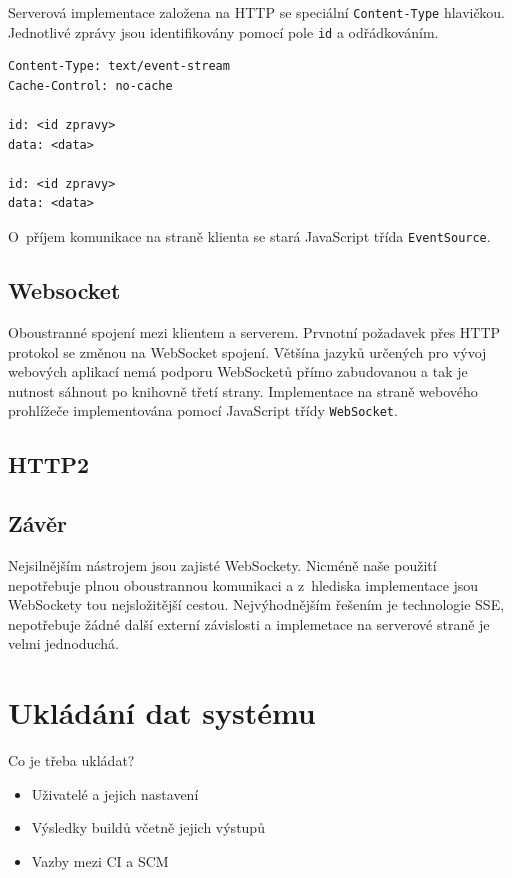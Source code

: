 \noindent
Serverová implementace založena na HTTP se speciální \verb|Content-Type| hlavičkou.
Jednotlivé zprávy jsou identifikovány pomocí pole \verb|id| a odřádkováním.

\begin{verbatim}
Content-Type: text/event-stream
Cache-Control: no-cache

id: <id zpravy>
data: <data>

id: <id zpravy>
data: <data>
\end{verbatim}

O~příjem komunikace na straně klienta se stará JavaScript třída \verb|EventSource|.

\subsection{Websocket}

Oboustranné spojení mezi klientem a serverem.
Prvnotní požadavek přes HTTP protokol se změnou na WebSocket spojení.
Většína jazyků určených pro vývoj webových aplikací nemá podporu WebSocketů přímo zabudovanou a tak je nutnost sáhnout po knihovně třetí strany.
Implementace na straně webového prohlížeče implementována pomocí JavaScript třídy \verb|WebSocket|.


\subsection{HTTP2}

\subsection{Závěr}

Nejsilnějším nástrojem jsou zajisté WebSockety.
Nicméně naše použití nepotřebuje plnou oboustrannou komunikaci a z~hlediska implementace jsou WebSockety tou nejsložitější cestou.
Nejvýhodnějším řešením je technologie SSE, nepotřebuje žádné další externí závislosti a implemetace na serverové straně je velmi jednoduchá.


\section{Ukládání dat systému}

Co je třeba ukládat?

\begin{itemize}
	\item Uživatelé a jejich nastavení
	\item Výsledky buildů včetně jejich výstupů
	\item Vazby mezi CI a SCM
\end{itemize}

